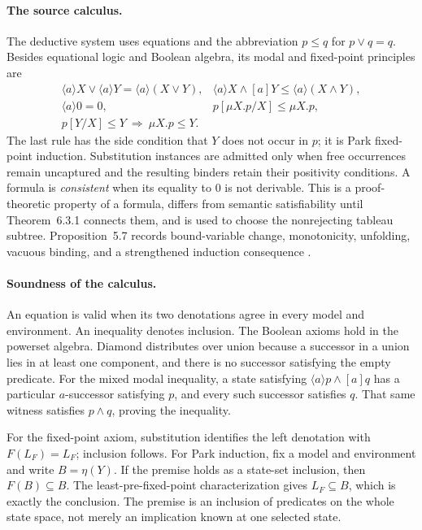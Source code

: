 \paragraph{The source calculus.}
\label{sec:p09-kozen-calculus}
The deductive system uses equations and the abbreviation
\(p\leq q\) for \(p\lor q=q\).  Besides equational logic and Boolean algebra,
its modal and fixed-point principles are
\[
\begin{array}{ll}
\langle a\rangle X\lor\langle a\rangle Y
   =\langle a\rangle(X\lor Y),&
\langle a\rangle X\land[a]Y
   \leq\langle a\rangle(X\land Y),\\
\langle a\rangle0=0,&
p[\mu X.p/X]\leq\mu X.p,\\
p[Y/X]\leq Y\ \Longrightarrow\ \mu X.p\leq Y.&
\end{array}
\]
The last rule has the side condition that \(Y\) does not occur in
\(p\); it is Park fixed-point induction. Substitution instances
are admitted only when free occurrences remain uncaptured
and the resulting binders retain their positivity conditions.
A formula is \emph{consistent}
when its equality to \(0\) is not derivable.  This is a proof-theoretic
property of a formula, differs from semantic satisfiability until
Theorem~6.3.1 connects them, and is used to choose the nonrejecting tableau
subtree.  Proposition~5.7 records bound-variable change, monotonicity,
unfolding, vacuous binding, and a strengthened induction consequence
\cite[pp.~341--342]{Kozen1983}.

\paragraph{Soundness of the calculus.}
\label{sec:p09-kozen-calculus-soundness}
An equation is valid when its two denotations agree in every
model and environment. An inequality denotes inclusion.
The Boolean axioms hold in the powerset algebra.
Diamond distributes over union because a successor in
a union lies in at least one component, and there is
no successor satisfying the empty predicate.
For the mixed modal inequality, a state satisfying
\(\langle a\rangle p\land[a]q\) has a particular
\(a\)-successor satisfying \(p\), and every such
successor satisfies \(q\). That same witness satisfies
\(p\land q\), proving the inequality.

For the fixed-point axiom, substitution identifies the
left denotation with \(F(L_F)=L_F\); inclusion follows.
For Park induction, fix a model and environment and
write \(B=\eta(Y)\). If the premise holds as a
state-set inclusion, then \(F(B)\subseteq B\).
The least-pre-fixed-point characterization gives
\(L_F\subseteq B\), which is exactly the conclusion.
The premise is an inclusion of predicates on the whole
state space, not merely an implication known at one
selected state.

